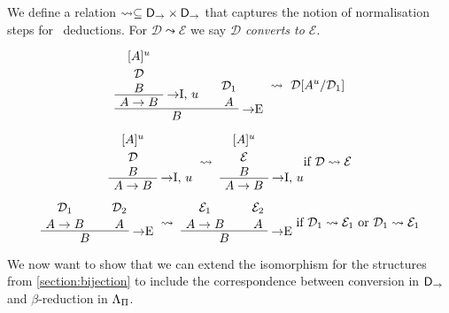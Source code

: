 \begin{definition}[Conversion]
We define a relation $\leadsto \subseteq \mathsf{D}_\to\times\mathsf{D}_\to$ that
captures the notion of normalisation steps for \implnpi\ deductions. For
$\mathcal{D}\leadsto\mathcal{E}$ we say \textit{$\mathcal{D}$ converts to
$\mathcal{E}$}.

\[
  \AxiomC{$[A]^u$}
  \noLine
  \UnaryInfC{$\mathcal{D}$}
  \noLine
  \UnaryInfC{$B$}
  \RightLabel{$\to$I, $u$}
  \UnaryInfC{$A \to B$}
  \AxiomC{$\mathcal{D}_1$}
  \noLine
  \UnaryInfC{$A$}
  \RightLabel{$\to$E}
  \BinaryInfC{$B$}
  \DisplayProof
\ \leadsto\ \mathcal{D}[A^u/\mathcal{D}_1]
\]


\[
  \AxiomC{$[A]^u$}
  \noLine
  \UnaryInfC{$\mathcal{D}$}
  \noLine
  \UnaryInfC{$B$}
  \RightLabel{$\to$I, $u$}
  \UnaryInfC{$A \to B$}
  \DisplayProof
\ \leadsto\ 
  \AxiomC{$[A]^u$}
  \noLine
  \UnaryInfC{$\mathcal{E}$}
  \noLine
  \UnaryInfC{$B$}
  \RightLabel{$\to$I, $u$}
  \UnaryInfC{$A \to B$}
  \DisplayProof
\mbox{if } \mathcal{D} \leadsto \mathcal{E}
\]

\[
  \AxiomC{$\mathcal{D}_1$}
  \noLine
  \UnaryInfC{$A \to B$}
  \AxiomC{$\mathcal{D}_2$}
  \noLine
  \UnaryInfC{$A$}
  \RightLabel{$\to$E}
  \BinaryInfC{$B$}
  \DisplayProof
\ \leadsto\ 
  \AxiomC{$\mathcal{E}_1$}
  \noLine
  \UnaryInfC{$A \to B$}
  \AxiomC{$\mathcal{E}_2$}
  \noLine
  \UnaryInfC{$A$}
  \RightLabel{$\to$E}
  \BinaryInfC{$B$}
  \DisplayProof
\mbox{ if } \mathcal{D}_1 \leadsto \mathcal{E}_1
\mbox{ or } \mathcal{D}_1 \leadsto \mathcal{E}_1
\]
\end{definition}

We now want to show that we can extend the isomorphism for the structures from
\ref{section:bijection} to include the correspondence between conversion in
$\mathsf{D}_\to$ and $\beta$-reduction in $\Lambda_\Pi$.

